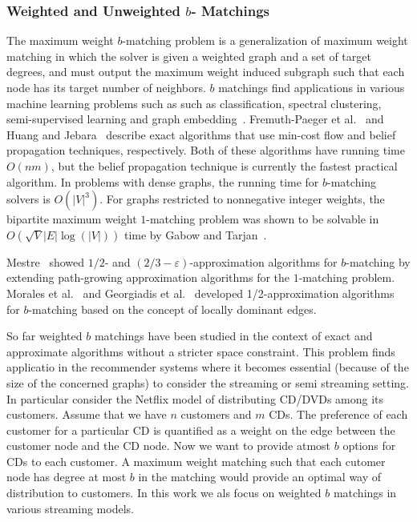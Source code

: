 \documentclass{scrartcl}
\begin{document}
\subsubsection{Weighted and Unweighted $b$- Matchings}
The maximum weight $b$-matching problem is a
generalization of maximum weight matching in which
the solver is given a weighted graph and a set of target
degrees, and must output the maximum weight
induced subgraph such that each node has its target
number of neighbors. $b$ matchings find applications in various machine learning problems such as such as classification, spectral clustering, semi-supervised learning and graph embedding~\cite{JH}.
 Fremuth-Paeger et al.~\cite{FPCJD}  and Huang and Jebara~\cite{JH} describe exact algorithms that use min-cost flow and belief propagation techniques, respectively. Both of these algorithms have running time $O(nm)$, but the belief propagation technique is currently the fastest practical algorithm.
In problems with dense
graphs, the running time for $b$-matching solvers is $O(|V|^3)$. For graphs restricted to nonnegative integer weights,
the bipartite maximum weight $1$-matching problem
was shown to be solvable in $O(\sqrt{V}|E| \log(|V |))$ time
by Gabow and Tarjan~\cite{GabowTarjan}.

Mestre~\cite{Mestre}  showed $1/2$- and $(2/3 - \varepsilon)$-approximation algorithms for $b$-matching by extending path-growing approximation algorithms for the $1$-matching problem. Morales et al.~\cite{DeFrancisciMorales} and Georgiadis et al.~\cite{GeorgiadisP13} developed 1/2-approximation algorithms for $b$-matching based on the concept of locally dominant edges.

So far weighted $b$ matchings have been studied in the context of exact and approximate algorithms without a stricter space constraint. This problem finds applicatio in the recommender systems where it becomes essential (because of the size of the concerned graphs) to consider the streaming or semi streaming setting. In particular consider the Netflix model of distributing CD/DVDs among its customers. Assume that we have $n$ customers and $m$ CDs. The preference of each customer for a particular CD is quantified as a weight on the edge between the customer node and the CD node. Now we want to provide atmost $b$ options for CDs to each customer. A maximum weight matching such that each cutomer node has degree at most $b$ in the matching would provide an optimal way of distribution to customers. In this work we als focus on weighted $b$ matchings in various streaming models.
\end{document}
